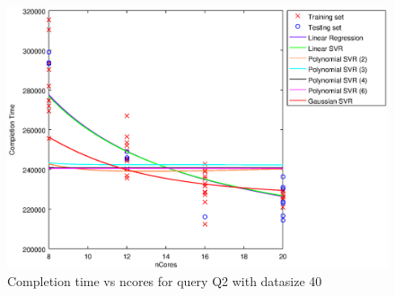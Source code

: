 
\begin {figure}[hbtp]
\centering
\includegraphics[width=\textwidth]{output/Q2_40_ALL_WITH_1_OVER_NCORES/plot_Q2_40.eps}
\caption{Completion time vs ncores for query Q2 with datasize 40}
\label{fig:all_linear_Q2_40}
\end {figure}
